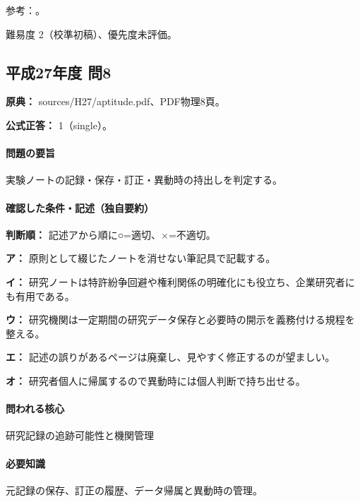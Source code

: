 \par 参考：\cite{mext_misconduct2014}。

\par 難易度 2（校準初稿）、優先度未評価。

\subsection{平成27年度 問8}
\label{q:h27-reg-apt-08}

\noindent\textbf{原典：} sources/H27/aptitude.pdf、PDF物理8頁。

\textbf{公式正答：} 1（single）。

\paragraph{問題の要旨} 実験ノートの記録・保存・訂正・異動時の持出しを判定する。

\paragraph{確認した条件・記述（独自要約）}\mbox{}\par

\noindent\textbf{判断順：} 記述アから順に○=適切、×=不適切。\par

\noindent\textbf{ア：} 原則として綴じたノートを消せない筆記具で記載する。\par

\noindent\textbf{イ：} 研究ノートは特許紛争回避や権利関係の明確化にも役立ち、企業研究者にも有用である。\par

\noindent\textbf{ウ：} 研究機関は一定期間の研究データ保存と必要時の開示を義務付ける規程を整える。\par

\noindent\textbf{エ：} 記述の誤りがあるページは廃棄し、見やすく修正するのが望ましい。\par

\noindent\textbf{オ：} 研究者個人に帰属するので異動時には個人判断で持ち出せる。\par

\paragraph{問われる核心} 研究記録の追跡可能性と機関管理

\paragraph{必要知識} 元記録の保存、訂正の履歴、データ帰属と異動時の管理。

